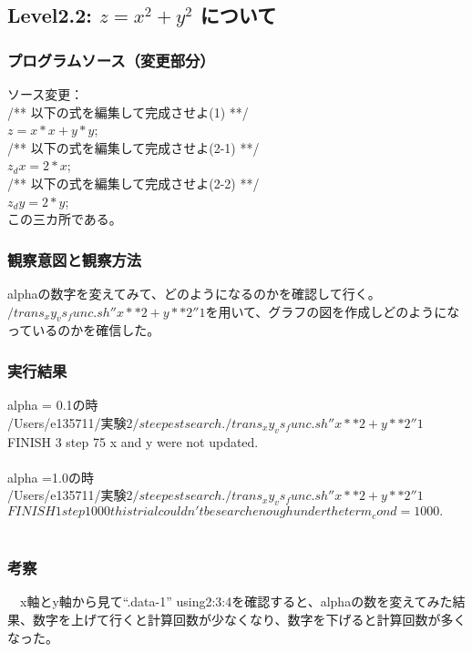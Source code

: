 \subsection{Level2.2: $z=x^2 + y^2$ について}
\subsubsection{プログラムソース（変更部分）}
ソース変更：\\
/** 以下の式を編集して完成させよ(1) **/\\
 $ z = x*x + y*y$;\\
/** 以下の式を編集して完成させよ(2-1) **/\\
$z_dx = 2*x$;\\
/** 以下の式を編集して完成させよ(2-2) **/\\
$z_dy = 2*y$;\\
この三カ所である。\\
\subsubsection{観察意図と観察方法}
alphaの数字を変えてみて、どのようになるのかを確認して行く。\\
$/trans_xy_vs_func.sh''x**2+y**2''1$を用いて、グラフの図を作成しどのようになっているのかを確信した。\\
\subsubsection{実行結果}
alpha = 0.1の時\\
/Users/e135711/実験2$/steepestsearch ./trans_xy_vs_func.sh''x**2+y**2'' 1$\\
FINISH 3 step 75 x and y were not updated.\\
\\
alpha =1.0の時\\
/Users/e135711/実験2$/steepestsearch ./trans_xy_vs_func.sh ''x**2+y**2'' 1$\\
$FINISH 1 step 1000 this trial couldn't be search enough under the term_cond=1000.$\\
\\
\subsubsection{考察}
　x軸とy軸から見て“.data-1” using2:3:4を確認すると、alphaの数を変えてみた結果、数字を上げて行くと計算回数が少なくなり、数字を下げると計算回数が多くなった。\\
